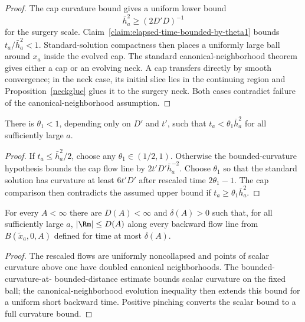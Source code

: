 \begin{proof}
\sketch
{}
The cap curvature bound gives a uniform lower bound
\begin{equation}
\label{hequat}
  \bar h_a^2\geq(2D'D)^{-1}
\end{equation}
for the surgery scale. Claim~\ref{claim:elapsed-time-bounded-by-theta1} bounds
$t_a/\bar h_a^2<1$. Standard-solution compactness then places a uniformly large
ball around $x_a$ inside the evolved cap. The standard canonical-neighborhood
theorem gives either a cap or an evolving neck. A cap transfers directly by
smooth convergence; in the neck case, its initial slice lies in the continuing
region and Proposition~\ref{neckglue} glues it to the surgery neck. Both cases
contradict failure of the canonical-neighborhood assumption.
\end{proof}

\begin{claim}
\label{claim:elapsed-time-bounded-by-theta1}
There is $\theta_1<1$, depending only on $D'$ and $t'$, such that
$t_a<\theta_1\bar h_a^2$ for all sufficiently large $a$.
\end{claim}

\begin{proof}
\sketch
{}
If $t_a\leq\bar h_a^2/2$, choose any $\theta_1\in(1/2,1)$. Otherwise the
bounded-curvature hypothesis bounds the cap flow line by
$2t'D'\bar h_a^{-2}$. Choose $\theta_1$ so that the standard solution has
curvature at least $6t'D'$ after rescaled time $2\theta_1-1$. The cap comparison
then contradicts the assumed upper bound if $t_a\geq\theta_1\bar h_a^2$.
\end{proof}

\begin{claim}
\label{claim:curvature-bound-along-backward-flow-lines}
\label{D(A)delta(A)}
For every $A<\infty$ there are $D(A)<\infty$ and $\delta(A)>0$ such that,
for all sufficiently large $a$, $|\Rm|\leq D(A)$ along every backward flow line
from $B(\widetilde x_a,0,A)$ defined for time at most $\delta(A)$.
\end{claim}

\begin{proof}
\sketch
{}
The rescaled flows are uniformly noncollapsed and points of scalar curvature
above one have doubled canonical neighborhoods. The bounded-curvature-at-
bounded-distance estimate bounds scalar curvature on the fixed ball; the
canonical-neighborhood evolution inequality then extends this bound for a
uniform short backward time. Positive pinching converts the scalar bound to a
full curvature bound.
\end{proof}

